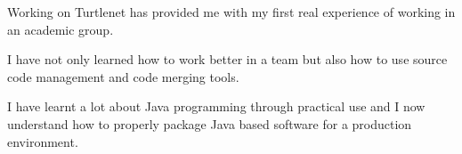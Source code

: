 Working on Turtlenet has provided me with my first real experience of working in an academic group.

I have not only learned how to work better in a team but also how to use source code management and code merging tools.

I have learnt a lot about Java programming through practical use and I now understand how to properly package Java based 
software for a production environment.
